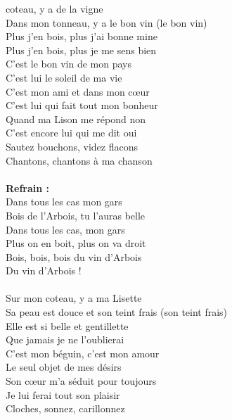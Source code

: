 
 coteau, y a de la vigne
\\Dans mon tonneau, y a le bon vin (le bon vin)
\\Plus j'en bois, plus j'ai bonne mine
\\Plus j'en bois, plus je me sens bien
\\C'est le bon vin de mon pays
\\C'est lui le soleil de ma vie
\\C'est mon ami et dans mon cœur
\\C'est lui qui fait tout mon bonheur
\\Quand ma Lison me répond non
\\C'est encore lui qui me dit oui
\\Sautez bouchons, videz flacons
\\Chantons, chantons à ma chanson
\\\\\textbf{Refrain :}
\\Dans tous les cas mon gars
\\Bois de l'Arbois, tu l'auras belle
\\Dans tous les cas, mon gars
\\Plus on en boit, plus on va droit
\\
{Bois, bois, bois du vin d'Arbois}
\\Du vin d'Arbois !
\breakpage
\\\\Sur mon coteau, y a ma Lisette
\\Sa peau est douce et son teint frais (son teint frais)
\\Elle est si belle et gentillette
\\Que jamais je ne l'oublierai
\\C'est mon béguin, c'est mon amour
\\Le seul objet de mes désirs
\\Son cœur m'a séduit pour toujours
\\Je lui ferai tout son plaisir
\\Cloches, sonnez, carillonnez
